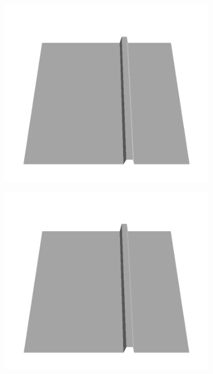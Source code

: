 \documentclass[../document.tex]{subfiles}
\begin{document}
\begin{figure}[H]
\begin{subfigure}[b]{0.24\textwidth}
    \end{subfigure}
    \begin{subfigure}[b]{0.24\textwidth}
    \includegraphics[width=\linewidth]{../img/5/custom_patches/walls_increasing/all/20-3d.png}
    \end{subfigure}
    \begin{subfigure}[b]{0.24\textwidth}
    \includegraphics[width=\linewidth]{../img/5/custom_patches/walls_increasing/all/25-3d.png}

\end{subfigure}
\end{figure}
\end{document}
